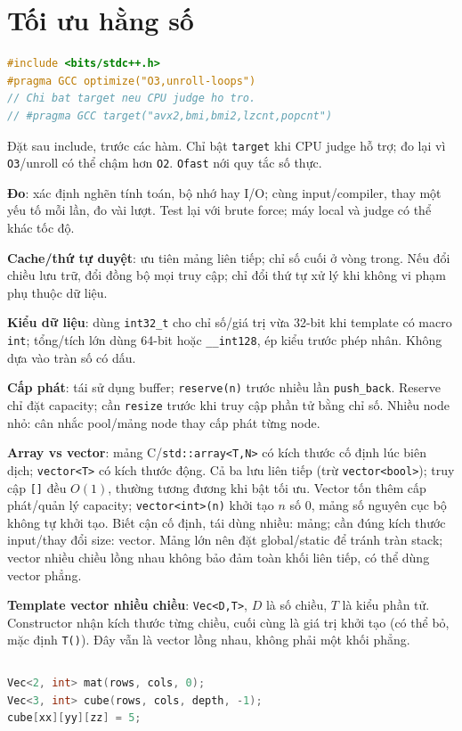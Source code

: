 \section*{Tối ưu hằng số}
\begin{lstlisting}[language=C++]
#include <bits/stdc++.h>
#pragma GCC optimize("O3,unroll-loops")
// Chi bat target neu CPU judge ho tro.
// #pragma GCC target("avx2,bmi,bmi2,lzcnt,popcnt")
\end{lstlisting}
Đặt sau include, trước các hàm. Chỉ bật \texttt{target} khi CPU judge hỗ trợ; đo lại vì \texttt{O3}/unroll có thể chậm hơn \texttt{O2}. \texttt{Ofast} nới quy tắc số thực.

\textbf{Đo}: xác định nghẽn tính toán, bộ nhớ hay I/O; cùng input/compiler, thay một yếu tố mỗi lần, đo vài lượt. Test lại với brute force; máy local và judge có thể khác tốc độ.

\textbf{Cache/thứ tự duyệt}: ưu tiên mảng liên tiếp; chỉ số cuối ở vòng trong. Nếu đổi chiều lưu trữ, đổi đồng bộ mọi truy cập; chỉ đổi thứ tự xử lý khi không vi phạm phụ thuộc dữ liệu.

\textbf{Kiểu dữ liệu}: dùng \texttt{int32\_t} cho chỉ số/giá trị vừa 32-bit khi template có macro \texttt{int}; tổng/tích lớn dùng 64-bit hoặc \texttt{\_\_int128}, ép kiểu trước phép nhân. Không dựa vào tràn số có dấu.

\textbf{Cấp phát}: tái sử dụng buffer; \texttt{reserve(n)} trước nhiều lần \texttt{push\_back}. Reserve chỉ đặt capacity; cần \texttt{resize} trước khi truy cập phần tử bằng chỉ số. Nhiều node nhỏ: cân nhắc pool/mảng node thay cấp phát từng node.

\textbf{Array vs vector}: mảng C/\texttt{std::array<T,N>} có kích thước cố định lúc biên dịch; \texttt{vector<T>} có kích thước động. Cả ba lưu liên tiếp (trừ \texttt{vector<bool>}); truy cập \texttt{[]} đều $O(1)$, thường tương đương khi bật tối ưu. Vector tốn thêm cấp phát/quản lý capacity; \texttt{vector<int>(n)} khởi tạo $n$ số $0$, mảng số nguyên cục bộ không tự khởi tạo. Biết cận cố định, tái dùng nhiều: mảng; cần đúng kích thước input/thay đổi size: vector. Mảng lớn nên đặt global/static để tránh tràn stack; vector nhiều chiều lồng nhau không bảo đảm toàn khối liên tiếp, có thể dùng vector phẳng.

\textbf{Template vector nhiều chiều}: \texttt{Vec<D,T>}, $D$ là số chiều, $T$ là kiểu phần tử. Constructor nhận kích thước từng chiều, cuối cùng là giá trị khởi tạo (có thể bỏ, mặc định \texttt{T()}). Đây vẫn là vector lồng nhau, không phải một khối phẳng.
\inputminted[]{cpp}{source/template/multidimensional.cpp}
\begin{lstlisting}[language=C++]
Vec<2, int> mat(rows, cols, 0);
Vec<3, int> cube(rows, cols, depth, -1);
cube[xx][yy][zz] = 5;
\end{lstlisting}

